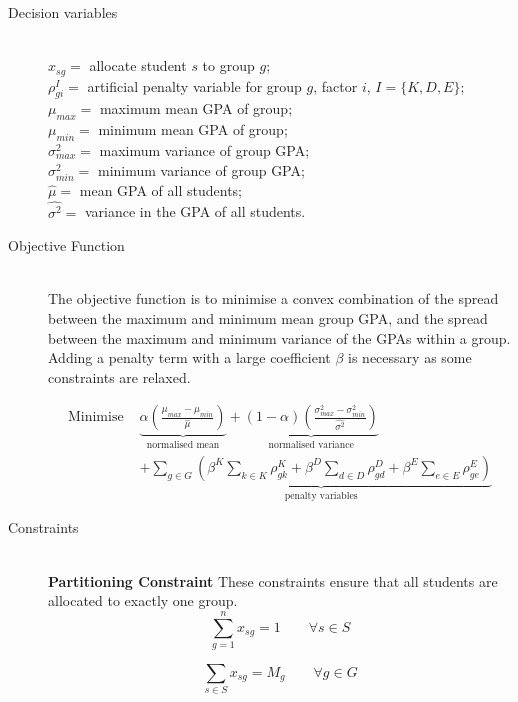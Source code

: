 \documentclass[12pt]{ORSNZ}
\begin{document}
\begin{description}
\item[Decision variables]\mbox{} \\
$x_{sg} = $ allocate student $s$ to group $g$;\\
$\rho^I_{gi} = $ artificial penalty variable for group $g$, factor $i$, \qquad $I=\{K, D, E\}$;\\
$\mu_{max} = $ maximum mean GPA of group;\\
$\mu_{min} = $ minimum mean GPA of group;\\
$\sigma^2_{max} = $ maximum variance of group GPA;\\
$\sigma^2_{min} = $  minimum variance of group GPA;\\
$\hat{\mu} = $ mean GPA of all students;\\
$\hat{\sigma^2} = $ variance in the GPA of all students.


\item[Objective Function]\mbox{} \\
The objective function is to minimise a convex combination of the spread between the maximum and minimum mean group GPA, and the spread between the maximum and minimum variance of the GPAs within a group. Adding a penalty term with a large coefficient $\beta$ is necessary as some constraints are relaxed.


\begin{equation}\begin{split}
\mbox{Minimise }&
\underbrace{\alpha\left(\frac{\mu_{max} - \mu_{min}}{\hat{\mu}}\right)}_{\mbox{normalised mean}} 
+ \underbrace{(1-\alpha)\left(\frac{\sigma^2_{max} - \sigma^2_{min}}{\hat{\sigma^2}}\right)}_{\mbox{normalised variance}}
\\&+ \underbrace{\sum_{g \in G}\left(\beta^K\sum_{k \in K}\rho^K_{gk} 
	+ \beta^D\sum_{d \in D}\rho^D_{gd} 
	+ \beta^E\sum_{e \in E}\rho^E_{ge}\right)}_{\mbox{penalty variables}}
\end{split}\end{equation}

\item[Constraints]\mbox{} \\
\textbf{Partitioning Constraint} These constraints ensure that all students are allocated to exactly one group.
\begin{equation} \label{con1}
\sum_{g=1}^n x_{sg} =  1 \qquad \mbox{$\forall s \in S$}
\end{equation}

\begin{equation} \label{con1}
\sum_{s \in S} x_{sg} =  M_g \qquad \mbox{$\forall g \in G$}
\end{equation}


\end{description}
\end{document}
